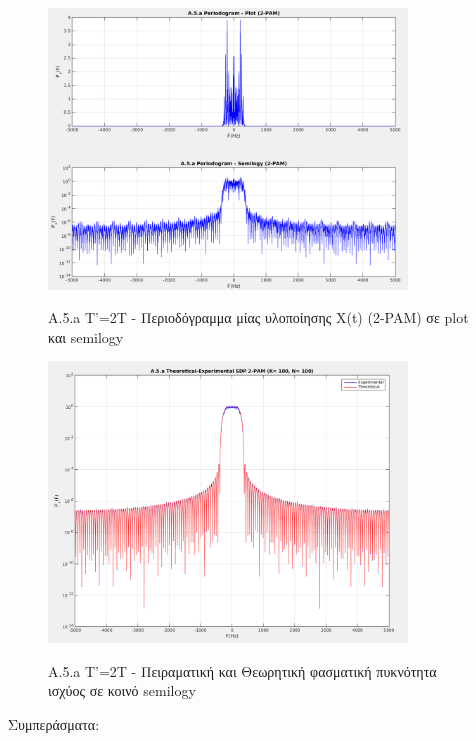 \documentclass[11pt]{article}
\begin{document}
      \begin{figure}[H]
        \centering
        \includegraphics[scale=0.5, width=0.85\textwidth]{photos/A.5.a Periodogram 2-PAM.png} \\
        \caption{A.5.a T'=2T - Περιοδόγραμμα μίας υλοποίησης X(t) (2-PAM) σε plot και semilogy}
    \end{figure}
    
      \begin{figure}[H]
        \centering
        \includegraphics[scale=0.5, width=0.85\textwidth]{photos/A.5.c - SDP 2-PAM_K-100_N-100.png} \\
        \caption{A.5.a T'=2T - Πειραματική και Θεωρητική φασματική πυκνότητα ισχύος σε κοινό semilogy}
    \end{figure}
    
    
    \par \noindent
    Συμπεράσματα:
    
\end{document}
